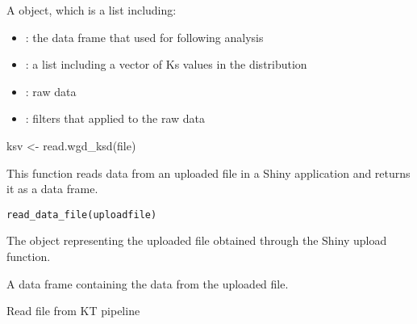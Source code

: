 \documentclass[a4paper]{book}
\begin{document}
%
\begin{Value}
A  object, which is a list including:
\begin{itemize}

\item{} : the data frame that used for following analysis
\item{} : a list including a vector of Ks values in the distribution
\item{} : raw data
\item{} : filters that applied to the raw data

\end{itemize}

\end{Value}
%
\begin{Examples}
\begin{ExampleCode}
ksv <- read.wgd_ksd(file)
\end{ExampleCode}
\end{Examples}
%
\begin{Description}\relax
This function reads data from an uploaded file in a Shiny application and returns it as a data frame.
\end{Description}
%
\begin{Usage}
\begin{verbatim}
read_data_file(uploadfile)
\end{verbatim}
\end{Usage}
%
\begin{Arguments}
\begin{ldescription}
\item[\code{uploadfile}] The object representing the uploaded file obtained through the Shiny upload function.
\end{ldescription}
\end{Arguments}
%
\begin{Value}
A data frame containing the data from the uploaded file.
\end{Value}
%
\begin{Examples}
\end{Examples}
%
\begin{Description}\relax
Read file from KT pipeline
\end{Description}
\end{document}
